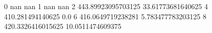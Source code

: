 0 nan nan
1 nan nan
2 443.89923095703125 33.61773681640625
4 410.281494140625 0.0
6 416.0649719238281 5.783477783203125
8 420.3326416015625 10.0511474609375
